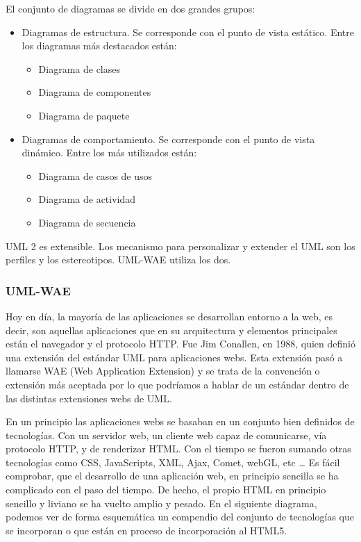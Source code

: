 El conjunto de diagramas se divide en dos grandes grupos:

\begin{itemize}
\item Diagramas de estructura. Se corresponde con el punto de vista estático. Entre los diagramas más destacados están:
\begin{itemize}
\item Diagrama de clases
\item Diagrama de componentes
\item Diagrama de paquete
\end{itemize}

\item Diagramas de comportamiento. Se corresponde con el punto de vista dinámico. Entre los más utilizados están:
\begin{itemize}
\item Diagrama de casos de usos
\item Diagrama de actividad
\item Diagrama de secuencia
\end{itemize}
\end{itemize}

UML 2 es extensible. Los mecanismo para personalizar y extender el UML son los perfiles y los estereotipos. UML-WAE utiliza los dos.

\subsubsection{UML-WAE}

Hoy en día, la mayoría de las aplicaciones se desarrollan entorno a la web, es decir, son aquellas aplicaciones que en su arquitectura y elementos principales están el navegador y el protocolo HTTP. Fue Jim Conallen, en 1988, quien definió una extensión del estándar UML para aplicaciones webs. Esta extensión pasó a llamarse WAE (Web Application Extension) y se trata de la convención o extensión más aceptada por lo que podríamos a hablar de un estándar dentro de las distintas extensiones webs de UML.

En un principio las aplicaciones webs se basaban en un conjunto bien definidos de tecnologías. Con un servidor web, un cliente web capaz de comunicarse, vía protocolo HTTP, y de renderizar HTML. Con el tiempo se fueron sumando otras tecnologías como CSS, JavaScripts, XML, Ajax, Comet, webGL, etc … Es fácil comprobar, que el desarrollo de una aplicación web, en principio sencilla se ha complicado con el paso del tiempo. De hecho, el propio HTML en principio sencillo y liviano se ha vuelto amplio y pesado. En el siguiente diagrama, podemos ver de forma esquemática un compendio del conjunto de tecnologías que se incorporan o que están en proceso de incorporación al HTML5.


